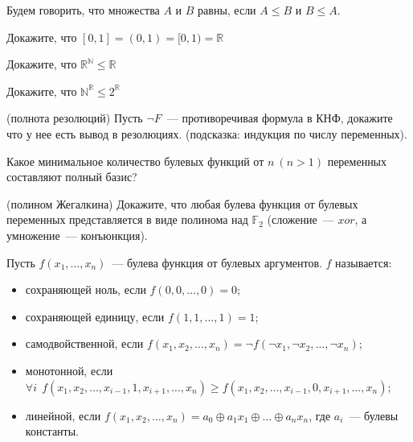 \setcounter{curtask}{8}


Будем говорить, что множества $A$ и $B$ равны, если $A \le B$ и $B \le A$.

\begin{task}
    Докажите, что $[0, 1] = (0, 1) = [0, 1) = \mathbb{R}$
\end{task}

\begin{task}
    Докажите, что $\mathbb{R}^{\mathbb{N}} \le \mathbb{R}$
\end{task}

\begin{task}
    Докажите, что $\mathbb{N}^{\mathbb{R}} \le 2^{\mathbb{R}}$
\end{task}

\begin{task} (полнота резолюций)
    Пусть $\neg F$~--- противоречивая формула в КНФ, докажите что у нее есть вывод в 
    резолюциях. (подсказка: индукция по числу переменных).
\end{task}

\begin{task}
    Какое минимальное количество булевых функций от $n~ (n > 1)$
    переменных составляют полный базис?
\end{task}

\begin{task}(полином Жегалкина)
    Докажите, что любая булева функция от булевых переменных
    представляется в виде полинома над $\mathbb{F}_2$ (сложение~---
    $xor$, а умножение~--- конъюнкция).
\end{task}


Пусть $f(x_1, \dots, x_n)$~--- булева функция от булевых аргументов.
$f$ называется:
\begin{itemize}
	\item сохраняющей ноль, если $f(0, 0, \dots, 0) = 0$;
	\item сохраняющей единицу, если $f(1, 1, \dots, 1) = 1$;
	\item самодвойственной, если $f(x_1, x_2, \dots, x_n) = \neg
		f(\neg x_1, \neg x_2, \dots, \neg x_n)$;
    \item монотонной, если
		$\forall i~~ f(x_1, x_2, \dots, x_{i - 1}, 1, x_{i + 1},
        \dots,  x_n) \ge f(x_1, x_2, \dots, x_{i - 1}, 0, x_{i + 1},
        \dots,  x_n)$;
    \item линейной, если $f(x_1, x_2, \dots, x_n) = a_0 \oplus a_1x_1
		\oplus \dots \oplus a_nx_n$, где $a_i$~--- булевы константы.
\end{itemize}

